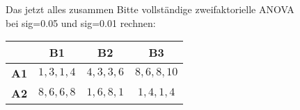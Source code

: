 \begin{frame}
  {Das jetzt alles zusammen}
  Bitte vollständige zweifaktorielle ANOVA\\
  bei sig=0.05 und sig=0.01 rechnen:\\

  \begin{center}
    \begin{tabular}[h!]{|c||c|c|c|}
      \hline
      & \textbf{B1} & \textbf{B2} & \textbf{B3} \\
      \hline
      \hline
      \textbf{A1} & $1, 3, 1, 4$ & $4, 3, 3, 6$ & $8, 6, 8, 10$ \\
      \hline
      \textbf{A2} & $8, 6, 6, 8$ & $1, 6, 8, 1$ & $1, 4, 1, 4$ \\
      \hline
    \end{tabular}
  \end{center}
\end{frame}
